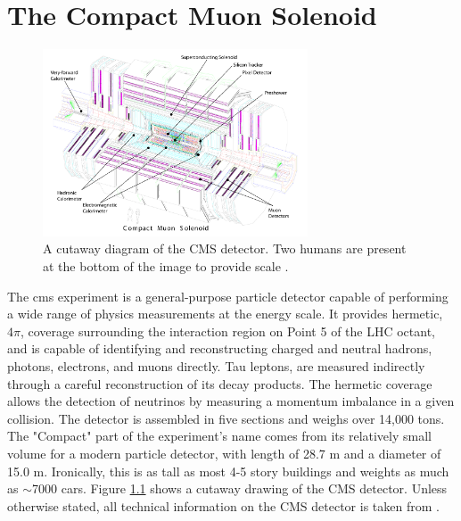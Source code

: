 \chapter{The Compact Muon Solenoid}
\label{cms_description_overview}

\begin{figure}[h]
   \centering
  \includegraphics[width=0.7\textwidth]{Figures/CMS_Diagrams/CMS__Complete_Labelled.pdf}
  \caption{A cutaway diagram of the CMS detector.  Two humans are
    present at the bottom of the image to provide scale \cite{CMS:CMS_Machine_Chatrchyan:2008aa}.} \label{fig:cms_complete}
\end{figure}

\par The \acrfull{cms} experiment is a general-purpose particle
detector capable of performing a wide range of physics measurements at
the \TeV energy scale.  It provides hermetic, $4\pi$, coverage
surrounding the interaction region on Point 5 of the LHC octant, and
is capable of identifying and reconstructing charged and neutral
hadrons, photons, electrons, and muons directly.  Tau leptons, are
measured indirectly through a careful reconstruction of its decay
products.  The hermetic coverage allows the detection of neutrinos by
measuring a momentum imbalance in a given collision.  The detector is
assembled in five sections and weighs over 14,000 tons.  The
"Compact" part of the experiment's name comes from its relatively
small volume for a modern particle detector, with length of 28.7 m
and a diameter of 15.0 m.  Ironically, this is as tall as most 4-5
story buildings and weights as much as $\sim$7000 cars.  Figure
\ref{fig:cms_complete} shows a cutaway drawing of the CMS detector.
Unless otherwise stated, all technical information on the CMS detector
is taken from \cite{CMS:CMS_Machine_Chatrchyan:2008aa}.  

